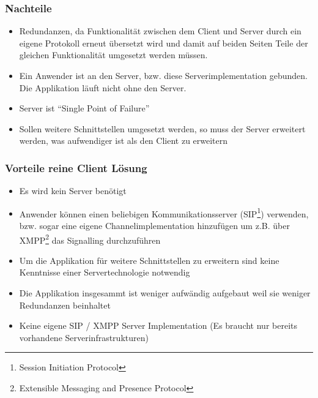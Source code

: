		\subsubsection{Nachteile}
		\begin{itemize}
			\item Redundanzen, da Funktionalität zwischen dem Client und Server durch ein eigene Protokoll erneut übersetzt wird und damit auf beiden Seiten Teile der gleichen Funktionalität umgesetzt werden müssen.
			\item Ein Anwender ist an den Server, bzw. diese Serverimplementation gebunden. Die Applikation läuft nicht ohne den Server.
			\item Server ist ``Single Point of Failure''
			\item Sollen weitere Schnittstellen umgesetzt werden, so muss der Server erweitert werden, was aufwendiger ist als den Client zu erweitern
		\end{itemize}


		\subsubsection{Vorteile reine Client Lösung}
		\begin{itemize}
			\item Es wird kein Server benötigt
			\item Anwender können einen beliebigen Kommunikationsserver (SIP\footnote{Session Initiation Protocol}) verwenden, bzw. sogar eine eigene Channelimplementation hinzufügen um z.B. über XMPP\footnote{Extensible Messaging and Presence Protocol} das Signalling durchzuführen
			\item Um die Applikation für weitere Schnittstellen zu erweitern sind keine Kenntnisse einer Servertechnologie notwendig
			\item Die Applikation insgesammt ist weniger aufwändig aufgebaut weil sie weniger Redundanzen beinhaltet
			\item Keine eigene SIP / XMPP Server Implementation (Es braucht nur bereits vorhandene Serverinfrastrukturen)
		\end{itemize}
